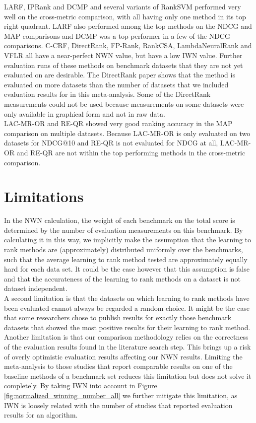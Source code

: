 \documentclass[english, authoryear, preprint]{elsarticle}
\begin{document}
LARF, IPRank and DCMP and several variants of RankSVM performed very well on the cross-metric comparison, with all having only one method in its top right quadrant. LARF also performed among the top methods on the NDCG and MAP comparisons and DCMP was a top performer in a few of the NDCG comparisons. C-CRF, DirectRank, FP-Rank, RankCSA, LambdaNeuralRank and VFLR all have a near-perfect NWN value, but have a low IWN value. Further evaluation runs of these methods on benchmark datasets that they are not yet evaluated on are desirable. The DirectRank paper \cite{Tan2013} shows that the method  is evaluated on more datasets than the number of datasets that we included evaluation results for in this meta-analysis. Some of the DirectRank measurements could not be used because measurements on some datasets were only available in graphical form and not in raw data.\\

LAC-MR-OR and RE-QR showed very good ranking accuracy in the MAP comparison on multiple datasets. Because LAC-MR-OR is only evaluated on two datasets for NDCG@10 and RE-QR is not evaluated for NDCG at all, LAC-MR-OR and RE-QR are not within the top performing methods in the cross-metric comparison. 

\section{Limitations}
In the NWN calculation, the weight of each benchmark on the total score is determined by the number of evaluation measurements on this benchmark. By calculating it in this way, we implicitly make the assumption that the learning to rank methods are (approximately) distributed uniformly over the benchmarks, such that the average learning to rank method tested are approximately equally hard for each data set. It could be the case however that this assumption is false and that the accurateness of the learning to rank methods on a dataset is not dataset independent.\\

A second limitation is that the datasets on which learning to rank methods have been evaluated cannot always be regarded a random choice. It might be the case that some researchers chose to publish results for exactly those benchmark datasets that showed the most positive results for their learning to rank method.\\

Another limitation is that our comparison methodology relies on the correctness of the evaluation results found in the literature search step. This brings up a risk of overly optimistic evaluation results affecting our NWN results. Limiting the meta-analysis to those studies that report comparable results on one of the baseline methods of a benchmark set reduces this limitation but does not solve it completely. By taking IWN into account in Figure \ref{fig:normalized_winning_number_all} we further mitigate this limitation, as IWN is loosely related with the number of studies that reported evaluation results for an algorithm.\\
\end{document}
